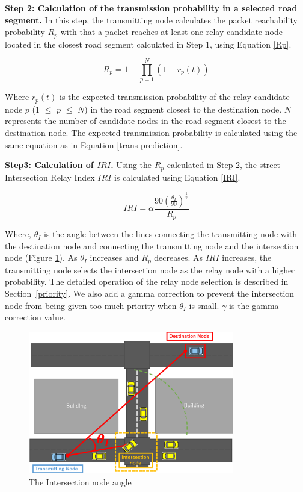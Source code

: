 \documentclass[conference]{IEEEtran}
\begin{document}
\textbf{Step 2: Calculation of the transmission probability in a selected road segment.}
In this step, the transmitting node calculates the packet reachability probability $R_p$ with that a packet reaches at least one relay candidate node located in the closest road segment calculated in Step 1, using Equation \ref{Rp}.

\begin{equation}
\label{Rp}
R_p = 1 - \prod_{p=1}^N (1 - r_{p}(t))
\end{equation}

Where $r_p(t)$ is the expected transmission probability of the relay candidate node $p$ (1 $\leq$  $p$ $\leq$ $N$) in the road segment closest to the destination node. 
$N$ represents the number of candidate nodes in the road segment closest to the destination node. 
The expected transmission probability is calculated using the same equation as in Equation \ref{trans-prediction}.


\textbf{Step3: Calculation of $IRI$.}
Using the $R_p$ calculated in Step 2, the street Intersection Relay  Index $IRI$ is calculated using Equation \ref{IRI}.

\begin{equation}
\label{IRI}
IRI = \alpha\frac{90\left(\frac{\theta_I}{90}\right)^\frac{1}{{\gamma}}}{R_p}
\end{equation}

Where, $\theta_I$ is the angle between the lines connecting the transmitting node with the destination node and  connecting the transmitting node and the intersection node (Figure \ref{fig:intersection_angle}).
As $\theta_I$  increases and $R_p$ decreases. 
As $IRI$ increases, the transmitting node selects the intersection node as the relay node with a higher probability. The detailed operation of the relay node selection is described in \mbox{Section \ref{priority}}.
We also add a gamma correction to prevent the intersection node from being given too much priority when $\theta_I$ is small.
$\gamma$ is the gamma-correction value.


\begin{figure}[!ht]
\centering
\includegraphics[width=90mm]{figures/Intersection_angle.eps}
\caption{The Intersection node angle}
\label{fig:intersection_angle}
\end{figure}
\end{document}

